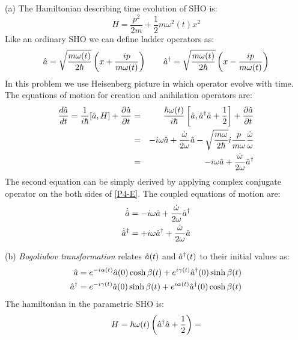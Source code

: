 \begin{homeworkProblem}
\begin{homeworkSection}{(a)}
The Hamiltonian describing time evolution of SHO is:
\begin{equation}\label{P4-H}
H=\frac{p^2}{2m}+\frac{1}{2}m\omega^2(t)x^2
\end{equation}
Like an ordinary SHO we can define ladder operators as:
\begin{equation}
\Hat{a}=\sqrt{\frac{m\omega(t)}{2\hbar}}\left(x+\frac{ip}{m\omega(t)}\right)\qquad \Hat{a}^\dagger=\sqrt{\frac{m\omega(t)}{2\hbar}}\left(x-\frac{ip}{m\omega(t)}\right)
\end{equation}
In this problem we use Heisenberg picture in which operator evolve with time. The equations of motion for creation and anihilation operators are:
\begin{eqnarray}
\frac{d\Hat{a}}{dt}=\frac{1}{i\hbar}[\Hat{a},H]+\dfrac{\partial \Hat{a}}{\partial t}&=&\frac{\hbar\omega(t)}{i\hbar}\left[\Hat{a},\Hat{a}^\dagger \Hat{a}+\frac{1}{2}\right]+\dfrac{\partial \Hat{a}}{\partial t}  \nonumber \\
&=&-i\omega\Hat{a}+\frac{\dot{\omega}}{2\omega}\Hat{a}-\sqrt{\frac{m\omega}{2\hbar}}i\frac{p}{m\omega}\frac{\dot{\omega}}{\omega} \nonumber \\
&=&-i\omega\Hat{a}+\frac{\dot{\omega}}{2\omega}\Hat{a}^\dagger
\label{P4-E}
\end{eqnarray}
The second equation can be simply derived by applying complex conjugate operator on the both sides of \eqref{P4-E}. The coupled equations of motion are:
\begin{align}
\dot{\Hat{a}}&=-i\omega\Hat{a}+\frac{\dot{\omega}}{2\omega}\Hat{a}^\dagger\\
\dot{\Hat{a}}^\dagger &=+i\omega\Hat{a}^\dagger+\frac{\dot{\omega}}{2\omega}\Hat{a}\\
\end{align}
\end{homeworkSection}
\begin{homeworkSection}{(b)}
\textit{Bogoliubov transformation} relates $\Hat{a}(t)$ and $\Hat{a}^\dagger(t)$ to their initial values as:
\begin{align}
\Hat{a}&=e^{-i\alpha(t)}\Hat{a}(0)\cosh\beta(t)+e^{i\gamma(t)}\Hat{a}^\dagger(0)\sinh\beta(t)\label{P4-T1}\\
\Hat{a}^\dagger &=e^{-i\gamma(t)}\Hat{a}(0)\sinh\beta(t)+e^{i\alpha(t)}\Hat{a}^\dagger(0)\cosh\beta(t)\label{P4-T2}
\end{align}
The hamiltonian in the parametric SHO is:
\begin{multline}
H=\hbar\omega(t)\left(\A{a}^\dagger\A{a}+\frac{1}{2}\right)=\\

\end{multline}
\end{homeworkSection}
\end{homeworkProblem}
